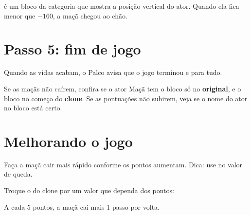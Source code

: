 \begin{dica}
 é um bloco da categoria  que mostra a posição vertical do ator. Quando ela fica menor que $-160$, a maçã chegou ao chão.
\end{dica}

\section{Passo 5: fim de jogo}

Quando as vidas acabam, o Palco avisa que o jogo terminou e para tudo.

\begin{codigo}[No Palco]
\begin{pilha}
\sbcend
{}
\end{pilha}
\end{codigo}

\begin{cuidado}
Se as maçãs não caírem, confira se o ator Maçã tem o bloco  só no \textbf{original}, e o bloco  no começo do \textbf{clone}. Se as pontuações não subirem, veja se o nome do ator no bloco  está certo.
\end{cuidado}

\section{Melhorando o jogo}

\begin{exercicio}
Faça a maçã cair mais rápido conforme os pontos aumentam. Dica: use  no valor de queda.
\end{exercicio}

\begin{solucao}
Troque o  do clone por um valor que dependa dos pontos:
\begin{pilha}
\end{pilha}
A cada 5 pontos, a maçã cai mais 1 passo por volta.
\end{solucao}

